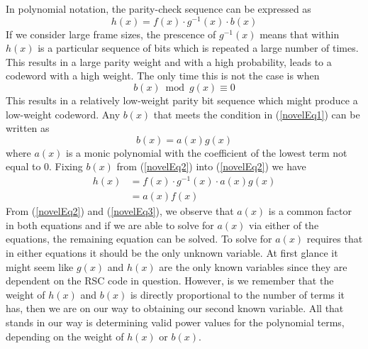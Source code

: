 In polynomial notation, the parity-check sequence can be expressed as 
\begin{equation}
h(x) =f(x)\cdot g^{-1}(x)\cdot b(x)
\label{novelEq0}
\end{equation}
If we consider large frame sizes, the prescence of $g^{-1}(x)$ means that within $h(x)$ is a particular sequence of bits which is repeated a large number of times. This results in a large parity weight and with a high probability, leads to a codeword with a high weight. The only time this is not the case is when
\begin{equation}
b(x) \bmod g(x) \equiv 0
\label{novelEq1}
\end{equation}
This results in a relatively low-weight parity bit sequence which might produce a low-weight codeword. Any $b(x)$ that meets the condition in (\ref{novelEq1}) can be written as 
\begin{equation}
b(x) =a(x)g(x)
\label{novelEq2}
\end{equation}
where $a(x)$ is a monic polynomial with the coefficient of the lowest term not equal to $0$.
Fixing $b(x)$ from (\ref{novelEq2}) into (\ref{novelEq2}) we have 
\begin{equation}
\begin{split}
h(x)&=f(x)\cdot g^{-1}(x)\cdot a(x)g(x)\\
&=a(x)f(x)
\end{split}
\label{novelEq3}
\end{equation}
From (\ref{novelEq2})  and (\ref{novelEq3}), we observe that $a(x)$ is a common factor in both equations and if we are able to solve for $a(x)$ via either of the equations, the remaining equation can be solved. To solve for $a(x)$ requires that in either equations it should be the only unknown variable. At first glance it might seem like $g(x)$ and $h(x)$ are the only known variables since they are dependent on the RSC code in question. However, is we remember that the weight of $h(x)$ and $b(x)$ is directly proportional to the number of terms it has, then we are on our way to obtaining our second known variable. All that stands in our way is determining valid power values for the polynomial  terms, depending on the weight of $h(x)$ or $b(x)$.


